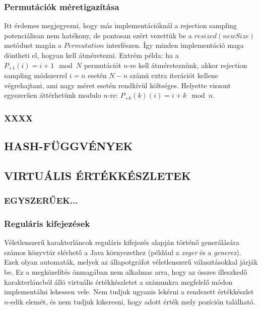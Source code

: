 \documentclass[
    parspace,
    noindent,
    nohyp,
]{elteiktdk}[2023/04/10]
\begin{document}
\subsubsection{Permutációk méretigazítása}

Itt érdemes megjegyezni, hogy más implementációknál a rejection sampling potenciálisan nem hatékony,
de pontosan ezért vezettük be a $resized(newSize)$ metódust magán a $Permutation$ interfészen.
Így minden implementáció maga döntheti el, hogyan kell átméretezni.
Extrém példa: ha a $P_{+1}(i) = i + 1 \mod N$ permutációt $n$-re kell átméreteznünk,
akkor rejection sampling módszerrel $i = n$ esetén $N - n$ számú extra iterációt kellene végrehajtani,
ami nagy méret esetén rendkívül költséges.
Helyette viszont egyszerűen áttérhetünk modulo $n$-re: $P_{+k}(k)(i) = i + k \mod n$.

\subsubsection{XXXX}



\subsection{HASH-FÜGGVÉNYEK}


\subsection{VIRTUÁLIS ÉRTÉKKÉSZLETEK}

\subsubsection{EGYSZERŰEK...}


\subsubsection{Reguláris kifejezések}

Véletlenszerű karakterláncok reguláris kifejezés alapján történő generálására
számos könyvtár elérhető a Java környezethez
(például a \textit{xeger} és a \textit{generex}).
Ezek olyan automaták, melyek az állapotgráfot véletlenszerű választásokkal járják be.
Ez a megközelítés önmagában nem alkalmas arra,
hogy az összes illeszkedő karakterláncból álló virtuális értékkészletet
a számunkra megfelelő módon implementálni lehessen vele.
Nem tudjuk ugyanis lekérni a rendezett értékkészlet $n$-edik elemét,
és nem tudjuk kikeresni, hogy adott érték mely pozíción található.
\end{document}
